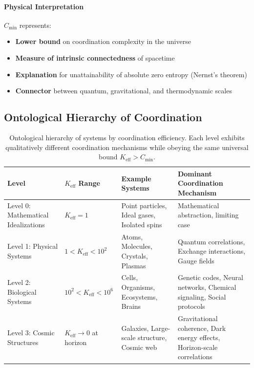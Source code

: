 \documentclass[11pt,a4paper]{article}
\begin{document}
\paragraph{Physical Interpretation}
$C_{\min}$ represents:
\begin{itemize}
	\item \textbf{Lower bound} on coordination complexity in the universe
	\item \textbf{Measure of intrinsic connectedness} of spacetime
	\item \textbf{Explanation} for unattainability of absolute zero entropy (Nernst's theorem)
	\item \textbf{Connector} between quantum, gravitational, and thermodynamic scales
\end{itemize}

\subsection{Ontological Hierarchy of Coordination}

\begin{table}[htbp]
	\centering
	\small
	\begin{tabular}{|p{}|p{}|p{}|p{}|}
		\hline
		\textbf{Level} & \textbf{$K_{\mathrm{eff}}$ Range} & \textbf{Example Systems} & \textbf{Dominant Coordination Mechanism} \\
		\hline
		Level 0: Mathematical Idealizations & $K_{\mathrm{eff}} = 1$ & Point particles, Ideal gases, Isolated spins & Mathematical abstraction, limiting case \\
		\hline
		Level 1: Physical Systems & $1 < K_{\mathrm{eff}} < 10^2$ & Atoms, Molecules, Crystals, Plasmas & Quantum correlations, Exchange interactions, Gauge fields \\
		\hline
		Level 2: Biological Systems & $10^2 < K_{\mathrm{eff}} < 10^6$ & Cells, Organisms, Ecosystems, Brains & Genetic codes, Neural networks, Chemical signaling, Social protocols \\
		\hline
		Level 3: Cosmic Structures & $K_{\mathrm{eff}} \to 0$ at horizon & Galaxies, Large-scale structure, Cosmic web & Gravitational coherence, Dark energy effects, Horizon-scale correlations \\
		\hline
	\end{tabular}
	\caption{Ontological hierarchy of systems by coordination efficiency. Each level exhibits qualitatively different coordination mechanisms while obeying the same universal bound $K_{\mathrm{eff}} > C_{\min}$.}
	\label{tab:ontology-hierarchy}
\end{table}
\end{document}
